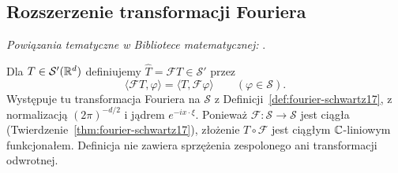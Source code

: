\subsection{Rozszerzenie transformacji Fouriera}

\noindent\emph{Powiązania tematyczne w Bibliotece matematycznej:} .


\begin{definicja}
\label{def:fourier-tempered22}
Dla $T\in\mathcal S'(\mathbb R^d)$ definiujemy
$\widehat T=\mathcal F T\in\mathcal S'$ przez
\[
\langle\mathcal F T,\varphi\rangle
=\langle T,\mathcal F\varphi\rangle
\qquad(\varphi\in\mathcal S).
\]
Występuje tu transformacja Fouriera na $\mathcal S$
z Definicji~\ref{def:fourier-schwartz17}, z normalizacją
$(2\pi)^{-d/2}$ i jądrem $e^{-ix\cdot\xi}$.
Ponieważ $\mathcal F:\mathcal S\to\mathcal S$ jest ciągła
(Twierdzenie~\ref{thm:fourier-schwartz17}), złożenie
$T\circ\mathcal F$ jest ciągłym $\mathbb C$-liniowym funkcjonałem.
Definicja nie zawiera sprzężenia zespolonego ani
transformacji odwrotnej.
\end{definicja}


